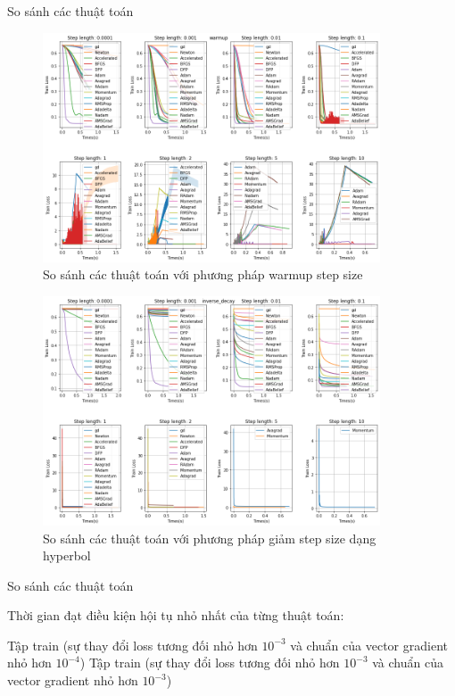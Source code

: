 \documentclass[10pt]{beamer}
\theoremstyle{remark}
\theoremstyle{definition}
\begin{document}
\begin{frame}[allowframebreaks]{So sánh các thuật toán}
	\begin{figure}
		\centering
		\includegraphics[width=10cm]{Thanh/warmup-lr-step-op_time.png}
		\caption{So sánh các thuật toán với phương pháp warmup step size}
	\end{figure}

	\begin{figure}
		\centering
		\includegraphics[width=10cm]{Thanh/inverse-lr-step-op_time.png}
		\caption{So sánh các thuật toán với phương pháp giảm step size dạng hyperbol}
	\end{figure}
\end{frame}

\begin{frame}{So sánh các thuật toán}

	Thời gian đạt điều kiện hội tụ nhỏ nhất của từng thuật toán:
	

	Tập train (sự thay đổi loss tương đối nhỏ hơn $10^{-3}$ và chuẩn của vector gradient nhỏ hơn $10^{-4}$)
	Tập train (sự thay đổi loss tương đối nhỏ hơn $10^{-3}$ và chuẩn của vector gradient nhỏ hơn $10^{-3}$)

\end{frame}
\end{document}
